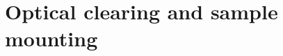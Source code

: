 \documentclass[12pt]{spieman}  %
\begin{document}
\section{Optical clearing and sample mounting}
%
		
\end{document}

